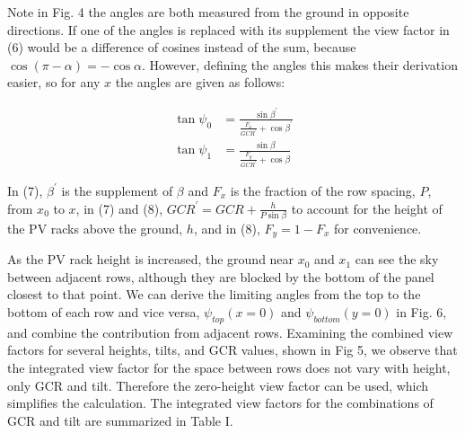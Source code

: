 \documentclass[conference]{IEEEtran}
\begin{document}
Note in Fig. 4 the angles are both measured from the ground in opposite directions.  If one of the angles is replaced with its supplement the view factor in (6) would be a difference of cosines instead of the sum, because $\cos \left(\pi - \alpha\right) = -\cos \alpha$.  However, defining the angles this makes their derivation easier, so for any $x$ the angles are given as follows:

\begin{align}
\tan \psi_0 &= \frac{\sin \beta^\prime}{\frac{F_x}{GCR^\prime} + \cos \beta^\prime}\\
\tan \psi_1 &= \frac{\sin \beta}{\frac{F_y}{GCR^\prime} + \cos \beta}
\end{align}

In (7), $\beta^\prime$ is the supplement of $\beta$ and $F_x$ is the fraction of the row spacing, $P$, from $x_0$ to $x$, in (7) and (8), $GCR^\prime=GCR+\frac{h}{P\sin\beta}$ to account for the height of the PV racks above the ground, $h$, and in (8), $F_y=1-F_x$ for convenience.

As the PV rack height is increased, the ground near $x_0$ and $x_1$ can see the sky between adjacent rows, although they are blocked by the bottom of the panel closest to that point.  We can derive the limiting angles from the top to the bottom of each row and vice versa, $\psi_{top}\left(x=0\right)$ and $\psi_{bottom}\left(y=0\right)$ in Fig. 6, and combine the contribution from adjacent rows.  Examining the combined view factors for several heights, tilts, and GCR values, shown in Fig 5, we observe that the integrated view factor for the space between rows does not vary with height, only GCR and tilt.  Therefore the zero-height view factor can be used, which simplifies the calculation.  The integrated view factors for the combinations of GCR and tilt are summarized in Table I.
\end{document}
